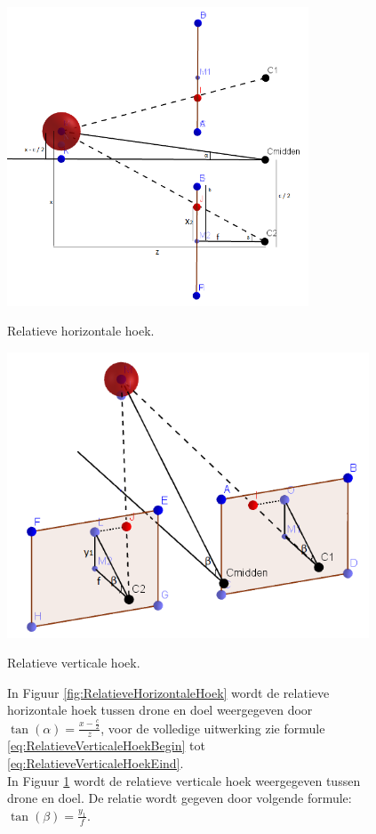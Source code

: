 \begin{figure}
	\centering
	\begin{minipage}{.45\textwidth}
		\centering
		\includegraphics[width=0.8\textwidth]{RelatieveHorizontaleHoek.png}
		\caption{Relatieve horizontale hoek.}
		\label{fig:RelatieveHorizontaleHoek}
	\end{minipage}
	\begin{minipage}{.45\textwidth}
		\centering
		\includegraphics[width=0.96\textwidth]{RelatieveVerticaleHoek.png}
		\caption{Relatieve verticale hoek.}
		\label{fig:RelatieveVerticaleHoek}
	\end{minipage}%
	\caption*{In Figuur \ref{fig:RelatieveHorizontaleHoek} wordt de relatieve horizontale hoek tussen drone en doel weergegeven door \(\tan(\alpha) = \frac{x-\frac{c}{2}}{z}\), voor de volledige uitwerking zie formule \ref{eq:RelatieveVerticaleHoekBegin} tot \ref{eq:RelatieveVerticaleHoekEind}.\\
		In Figuur \ref{fig:RelatieveVerticaleHoek} wordt de relatieve verticale hoek weergegeven tussen drone en doel. De relatie wordt gegeven door volgende formule: \(\tan(\beta) = \frac{y_1}{f}\).}
\end{figure}
